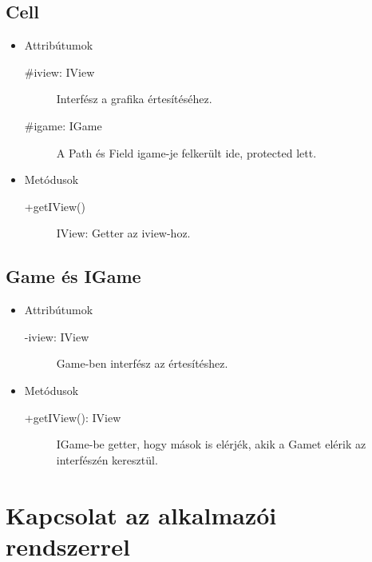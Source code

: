 \subsection{Cell}
\begin{itemize}
\item Attribútumok\\
	\begin{description}
		\item[\#iview: IView] Interfész a grafika értesítéséhez.
		\item[\#igame: IGame] A Path és Field igame-je felkerült ide, protected lett.
\end{description}
\item Metódusok\\
	\begin{description}
		\item[+getIView()] IView: Getter az iview-hoz.
	\end{description}
\end{itemize}

\subsection{Game és IGame}
\begin{itemize}
\item Attribútumok\\
	\begin{description}
		\item[-iview: IView] Game-ben interfész az értesítéshez.
\end{description}
\item Metódusok\\
	\begin{description}
		\item[+getIView(): IView] IGame-be getter, hogy mások is elérjék, akik a Gamet elérik az interfészén keresztül.
	\end{description}
\end{itemize}



\section{Kapcsolat az alkalmazói rendszerrel}
